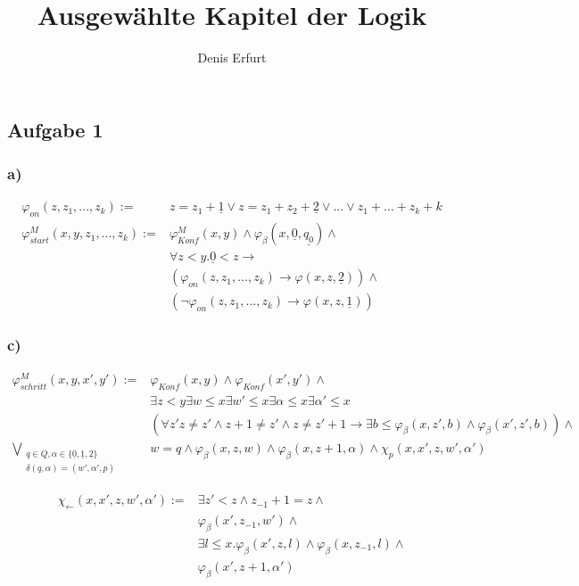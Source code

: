 \documentclass[12pt]{article}
\begin{document}
\title{Ausgewählte Kapitel der Logik}
\author{Denis Erfurt}
\maketitle



\subsection*{Aufgabe 1}
\subsubsection*{a)}
\begin{align*}
  \varphi_{on}(z, z_1,...,z_k):=&z=z_1+\underline{1}\lor z = z_1 + z_2 + \underline{2} \lor ... \lor z_1 + ... +z_k + k \\
  \varphi_{start}^M(x,y,z_1,...,z_k) := &\varphi_{Konf}^M(x,y) \land
  \varphi_\beta(x,\underline{0},\underline{q_0}) \land \\
  &\forall z < y. \underline{0} < z \rightarrow  \\
  &(\varphi_{on}(z, z_1, ..., z_k) \rightarrow \varphi(x,z,\underline{2})) \land \\
  &(\neg\varphi_{on}(z, z_1, ..., z_k) \rightarrow \varphi(x,z,\underline{1}))
\end{align*}

\subsubsection*{c)}
\begin{align*}
  \varphi_{schritt}^M(x,y,x',y') :=& \varphi_{Konf}(x,y) \land \varphi_{Konf}(x',y') \land \\
  & \exists z < y \exists w \leq x \exists w' \leq x \exists \alpha \leq x \exists \alpha' \leq x\\
  &(\forall z' z\neq z'\land z+1\neq z'\land z\neq z'+1 \rightarrow \exists b\leq \varphi_\beta(x,z',b)\land\varphi_\beta(x',z',b))\land \\
  \bigvee_{\substack{q\in Q,\alpha\in\{\underline{0},\underline{1},\underline{2}\} \\ \delta(q,\alpha)=(w',\alpha',p)}} &
  w=q \land \varphi_\beta(x,z,w) \land \varphi_\beta(x,z+1,\alpha) \land \chi_p(x,x',z,w',\alpha')
\end{align*}

\begin{align*}
  \chi_{\leftarrow}(x,x',z,w',\alpha') := &\exists z'<z \land z_{-1} + 1 = z \land \\
  &\varphi_\beta(x', z_{-1}, w')  \land \\
  &\exists l\leq x.\varphi_\beta(x', z, l)\land \varphi_\beta(x, z_{-1}, l) \land \\
  &\varphi_\beta(x',z+1,\alpha') \\
\end{align*}
\end{document}
